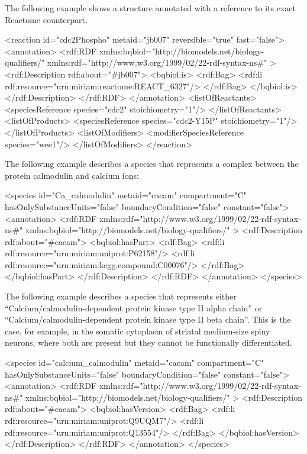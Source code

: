 The following example shows a \Reaction structure annotated
with a reference to its exact Reactome counterpart.

\begin{example}
<reaction id="cdc2Phospho" metaid="jb007" reversible="true" fast="false">
  <annotation>
    <rdf:RDF
      xmlns:bqbiol="http://biomodels.net/biology-qualifiers/"
      xmlns:rdf="http://www.w3.org/1999/02/22-rdf-syntax-ns\#"
    >
      <rdf:Description rdf:about="#jb007">
        <bqbiol:is>
          <rdf:Bag>
            <rdf:li rdf:resource="urn:miriam:reactome:REACT_6327"/>
          </rdf:Bag>
        </bqbiol:is>
      </rdf:Description>
    </rdf:RDF>
  </annotation>
  <listOfReactants>
    <speciesReference species="cdc2" stoichiometry="1"/>
  </listOfReactants>
  <listOfProducts>
    <speciesReference species="cdc2-Y15P" stoichiometry="1"/>
  </listOfProducts>
  <listOfModifiers>
    <modifierSpeciesReference species="wee1"/>
  </listOfModifiers>
</reaction>
\end{example}

The following example describes a species that represents a
complex between the protein calmodulin and calcium ions:

\begin{example}
<species id="Ca_calmodulin" metaid="cacam" compartment="C"
         hasOnlySubstanceUnits="false" boundaryCondition="false"
         constant="false">
  <annotation>
    <rdf:RDF
      xmlns:rdf="http://www.w3.org/1999/02/22-rdf-syntax-ns\#"
      xmlns:bqbiol="http://biomodels.net/biology-qualifiers/"
    >
      <rdf:Description rdf:about="\#cacam">
        <bqbiol:hasPart>
          <rdf:Bag>
            <rdf:li rdf:resource="urn:miriam:uniprot:P62158"/>
            <rdf:li rdf:resource="urn:miriam:kegg.compound:C00076"/>
          </rdf:Bag>
        </bqbiol:hasPart>
      </rdf:Description>
    </rdf:RDF>
  </annotation>
</species>
\end{example}

The following example describes a species that represents either
``Calcium/calmodulin-dependent protein kinase type II alpha
chain'' or ``Calcium/calmodulin-dependent protein kinase type II
beta chain''. This is the case, for example, in the somatic
cytoplasm of striatal medium-size spiny neurons, where both are
present but they cannot be functionally differentiated.


\begin{example}
<species id="calcium_calmodulin" metaid="cacam" compartment="C"
         hasOnlySubstanceUnits="false" boundaryCondition="false"
         constant="false">
  <annotation>
    <rdf:RDF
      xmlns:rdf="http://www.w3.org/1999/02/22-rdf-syntax-ns\#"
      xmlns:bqbiol="http://biomodels.net/biology-qualifiers/"
    >
      <rdf:Description rdf:about="\#cacam">
        <bqbiol:hasVersion>
          <rdf:Bag>
            <rdf:li rdf:resource="urn:miriam:uniprot:Q9UQM7"/>
            <rdf:li rdf:resource="urn:miriam:uniprot:Q13554"/>
          </rdf:Bag>
        </bqbiol:hasVersion>
      </rdf:Description>
    </rdf:RDF>
  </annotation>
</species>
\end{example}


